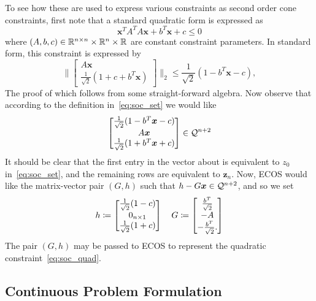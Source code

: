 \documentclass[10pt]{article}
\begin{document}
To see how these are used to express various constraints as second order cone constraints, first note that a standard quadratic form is expressed as
\begin{equation}
\bm{x}^T A ^T A \bm{x} + b^T \bm{x} + c \leq 0
\label{eq:soc_quad}
\end{equation}
where $(A,b,c) \in {\mathbb{R}}^{n\times n} \times {\mathbb{R}}^n \times {\mathbb{R}}$ are constant constraint parameters. In standard form, this constraint is expressed by
\begin{equation}
\biggr\| \begin{bmatrix}
A \bm{x} \\ \frac{1}{\sqrt{2}}( 1 + c + b^T \bm{x} )
\end{bmatrix} \biggr\|_2 \leq \frac{1}{\sqrt{2}} ( 1 - b^T \bm{x} - c),
\label{eq:soc_std}
\end{equation} 
The proof of which follows from some straight-forward algebra. Now observe that according to the definition in~\eqref{eq:soc_set} we would like
\begin{equation*}
\begin{bmatrix}
\frac{1}{\sqrt{2}} ( 1 - b^T \bm{x} - c) \\
A \bm{x} \\
\frac{1}{\sqrt{2}} ( 1 + b^T \bm{x} + c)
\end{bmatrix} \in \mathcal{Q}^{n+2}
\end{equation*}
It should be clear that the first entry in the vector about is equivalent to $z_0$ in~\eqref{eq:soc_set}, and the remaining rows are equivalent to $\bm{z}_n$. Now, ECOS would like the matrix-vector pair $(G,h)$ such that $h-G\bm{x}\in\mathcal{Q}^{n+2}$, and so we set
\begin{equation}
h \coloneqq \begin{bmatrix}
\frac{1}{\sqrt{2}}( 1 - c ) \\ 0_{n \times 1} \\ \frac{1}{\sqrt{2}}(1+c)
\end{bmatrix} \quad G \coloneqq \begin{bmatrix}
\frac{b^T}{\sqrt{2}} \\ -A \\ -\frac{b^T}{\sqrt{2}}.
\end{bmatrix}
\end{equation}
The pair $(G,h)$ may be passed to ECOS to represent the quadratic constraint~\eqref{eq:soc_quad}.

\subsection*{Continuous Problem Formulation}
\end{document}
